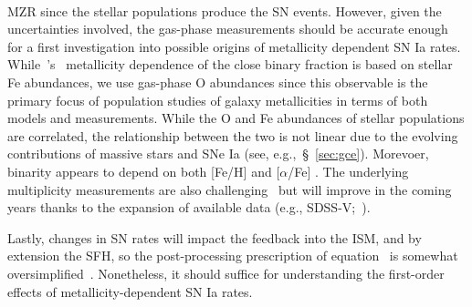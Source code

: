 \documentclass[foo.tex]{subfiles}
\begin{document}
$${MZR since the stellar populations produce the SN events.
However, given the uncertainties involved, the gas-phase measurements should be
accurate enough for a first investigation into possible origins of metallicity
dependent SN Ia rates.
While~\citeauthor{Moe2019}'s~\citeyearpar{Moe2019} metallicity dependence of
the close binary fraction is based on stellar Fe abundances, we use gas-phase
O abundances since this observable is the primary focus of population studies
of galaxy metallicities in terms of both models and measurements.
While the O and Fe abundances of stellar populations are correlated, the
relationship between the two is not linear due to the evolving contributions of
massive stars and SNe Ia (see, e.g.,~\S~\ref{sec:gce}).
Morevoer, binarity appears to depend on both [Fe/H] and [$\alpha$/Fe]
\citep{Mazzola2020}.
The underlying multiplicity measurements are also challenging~\citep{Moe2017,
Offner2022} but will improve in the coming years thanks to the expansion of
available data (e.g., SDSS-V;~\citealp{Kollmeier2017}).
\par
Lastly, changes in SN rates will impact the feedback into the ISM, and by
extension the SFH, so the post-processing prescription of
equation~ is somewhat oversimplified~\citep{Gandhi2022}.
Nonetheless, it should suffice for understanding the first-order effects of
metallicity-dependent SN Ia rates.
}
\end{document}
